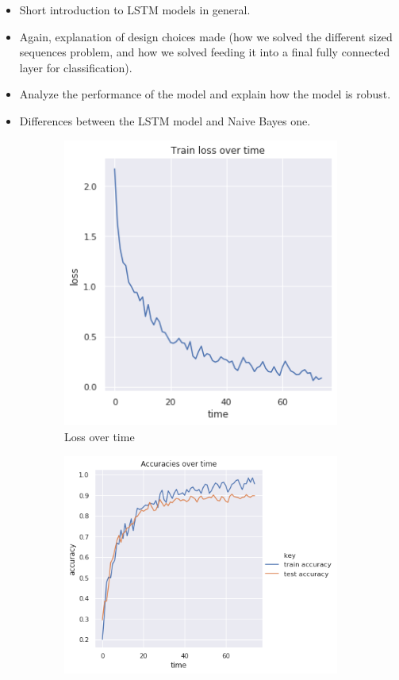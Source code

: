 \documentclass[12pt]{extreport}
\begin{document}
\begin{itemize}
    \item Short introduction to LSTM models in general.
    \item Again, explanation of design choices made (how we solved the different sized sequences problem, and how we solved feeding it into a final fully connected layer for classification).
    \item Analyze the performance of the model and explain how the model is robust.
    \item Differences between the LSTM model and Naive Bayes one.
\end{itemize}

\begin{figure}[H]
\centering
\begin{subfigure}{.5\textwidth}
  \centering
  \includegraphics[width=.76\linewidth]{assets/framework/lstm_BERT_loss_holdout.png}
  \caption{Loss over time}
  \label{fig:lstm-loss}
\end{subfigure}%
\begin{subfigure}{.5\textwidth}
  \centering
  \includegraphics[width=\linewidth]{assets/framework/lstm_BERT_accuracy_holdout.png}

\end{subfigure}
\end{figure}
\end{document}
